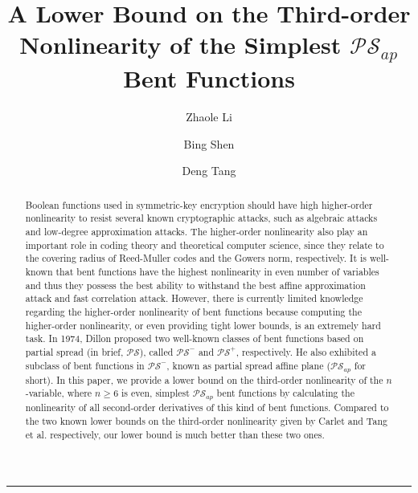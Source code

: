 \documentclass{article}
\title{A Lower Bound on the Third-order Nonlinearity of the Simplest $\mathcal{PS}_{ap}$ Bent Functions}
\author[a]{Zhaole Li}
\author[b]{Bing Shen}
\author[a,b]{Deng Tang}
\affil[a]{School of Electronic Information and Electrical Engineering, Shanghai Jiao Tong University, Shanghai 200240, China}
\affil[b]{Science and Technology on Communication Security Laboratory, Chengdu 610041, Sichuan, China}
\newcommand{\0}{\textbf{0}}
\newcommand{\1}{\textbf{1}}
\theoremstyle{plain}
\begin{document}
 \maketitle
  \noindent
  \rule{\linewidth}{0.4pt}

\begin{abstract}
Boolean functions used in symmetric-key encryption should have high higher-order nonlinearity to resist several known cryptographic attacks,
such as algebraic attacks and low-degree approximation attacks.
The higher-order nonlinearity also play an important role in coding theory and theoretical computer science, since they relate to the covering radius of Reed-Muller codes and the Gowers norm, respectively.
It is well-known that bent functions have the highest nonlinearity in even number of variables and thus they possess
the best ability to withstand the best affine approximation attack and fast correlation attack.
However, there is currently limited knowledge regarding the higher-order nonlinearity of bent functions
because computing the higher-order nonlinearity, or even providing tight lower bounds, is an extremely hard task.
In 1974, Dillon proposed two well-known classes of bent functions based on partial spread (in brief, $\mathcal{PS}$), called
$\mathcal{PS}^-$ and $\mathcal{PS}^+$, respectively. He also exhibited a subclass of bent functions in $\mathcal{PS}^-$, known as
partial spread affine plane ($\mathcal{PS}_{ap}$ for short).
In this paper, we provide a lower bound on the third-order nonlinearity of the $n$-variable, where $n\ge 6$ is even, simplest $\mathcal{PS}_{ap}$ bent functions by calculating the nonlinearity of all second-order derivatives of this kind of bent functions.
Compared to the two known lower bounds on the third-order nonlinearity given by Carlet and Tang et al. respectively,
our lower bound is much better than these two ones.
\end{abstract}
\end{document}
